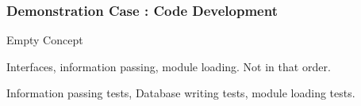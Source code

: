 

\begin{frame}[ctb!]
  \frametitle{Demonstration Case : Code Development}
  Empty Concept

  Interfaces, information passing, module loading. Not in that order.

  Information passing tests, Database writing tests, module loading tests.
\end{frame}
